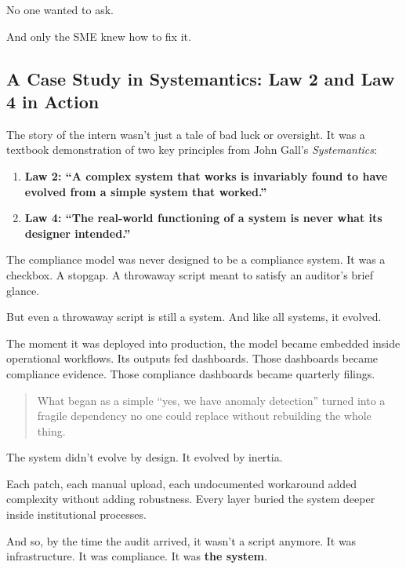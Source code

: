     No one wanted to ask.
    
    And only the SME knew how to fix it.

    




    \subsection{A Case Study in Systemantics: Law 2 and Law 4 in Action}

    The story of the intern wasn’t just a tale of bad luck or oversight. It was a textbook demonstration of two key principles from John Gall’s \textit{Systemantics}:
    
    \begin{enumerate}
        \item \textbf{Law 2: “A complex system that works is invariably found to have evolved from a simple system that worked.”}
        \item \textbf{Law 4: “The real-world functioning of a system is never what its designer intended.”}
    \end{enumerate}
    
    The compliance model was never designed to be a compliance system.  
    It was a checkbox.  
    A stopgap.  
    A throwaway script meant to satisfy an auditor’s brief glance.
    
    But even a throwaway script is still a system.  
    And like all systems, it evolved.
    
    \medskip
    
    The moment it was deployed into production, the model became embedded inside operational workflows.  
    Its outputs fed dashboards.  
    Those dashboards became compliance evidence.  
    Those compliance dashboards became quarterly filings.
    
    \begin{quote}
    What began as a simple “yes, we have anomaly detection” turned into a fragile dependency no one could replace without rebuilding the whole thing.
    \end{quote}
    
    The system didn’t evolve by design.  
    It evolved by inertia.
    
    Each patch, each manual upload, each undocumented workaround added complexity without adding robustness.  
    Every layer buried the system deeper inside institutional processes.
    
    And so, by the time the audit arrived, it wasn’t a script anymore.  
    It was infrastructure.  
    It was compliance.  
    It was \textbf{the system}.
    
